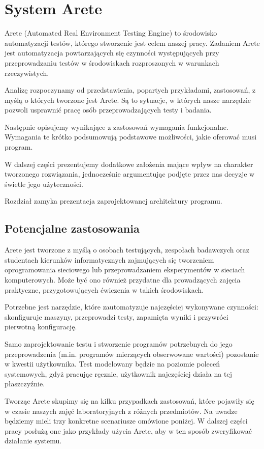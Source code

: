 \documentclass[00-praca-magisterska.tex]{subfiles}
\begin{document}
\chapter{System Arete}
\label{arete}

Arete (Automated Real Environment Testing Engine) to środowisko automatyzacji
testów, którego stworzenie jest celem naszej pracy. Zadaniem Arete jest
automatyzacja powtarzających się czynności występujących przy przeprowadzaniu
testów w środowiskach rozproszonych w warunkach rzeczywistych.

Analizę rozpoczynamy od przedstawienia, popartych przykładami, zastosowań, z
myślą o których tworzone jest Arete. Są to sytuacje, w których nasze narzędzie
pozwoli usprawnić pracę osób przeprowadzających testy i badania.

Następnie opisujemy wynikające z zastosowań wymagania funkcjonalne. Wymagania
te krótko podsumowują podstawowe możliwości, jakie oferować musi program.

W dalszej części prezentujemy dodatkowe założenia mające wpływ na charakter
tworzonego rozwiązania, jednocześnie argumentując podjęte przez nas decyzje w
świetle jego użyteczności.

Rozdział zamyka prezentacja zaprojektowanej architektury programu.

\section{Potencjalne zastosowania}
\label{arete-zastosowania}

Arete jest tworzone z myślą o osobach testujących, zespołach badawczych oraz
studentach kierunków informatycznych zajmujących się tworzeniem oprogramowania
sieciowego lub przeprowadzaniem eksperymentów w sieciach komputerowych. Może
być ono również przydatne dla prowadzących zajęcia praktyczne, przygotowujących
ćwiczenia w takich środowiskach.

Potrzebne jest narzędzie, które zautomatyzuje najczęściej wykonywane
czynności: skonfiguruje maszyny, przeprowadzi testy, zapamięta wyniki i
przywróci pierwotną konfigurację.

Samo zaprojektowanie testu i stworzenie programów potrzebnych do jego
przeprowadzenia (m.in. programów mierzących obserwowane wartości) pozostanie w
kwestii użytkownika. Test modelowany będzie na poziomie poleceń systemowych,
gdyż pracując ręcznie, użytkownik najczęściej działa na tej płaszczyźnie.

Tworząc Arete skupimy się na kilku przypadkach zastosowań, które pojawiły się w
czasie naszych zajęć laboratoryjnych z różnych przedmiotów. Na uwadze będziemy
mieli trzy konkretne scenariusze omówione poniżej. W dalszej części pracy
posłużą one jako przykłady użycia Arete, aby w ten sposób zweryfikować
działanie systemu.
\end{document}
